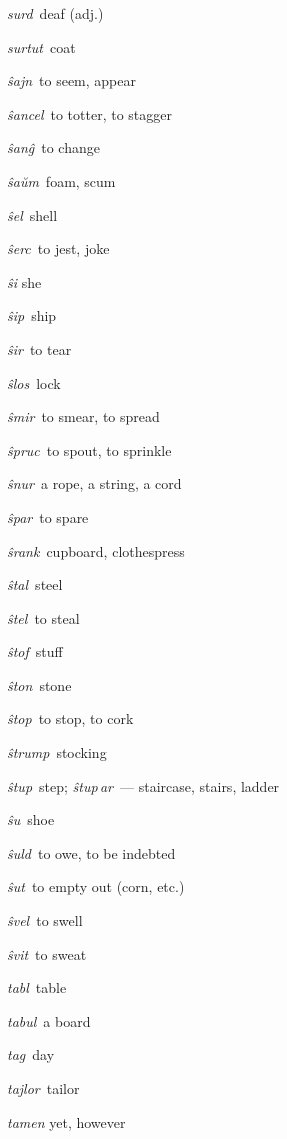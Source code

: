 \begin{landscape}
\begin{multicols}{5}
\begin{outdent}{1em}
\emph{surd\,} deaf (adj.)

\emph{surtut\,} coat
\end{outdent}


\begin{outdent}{1em}
\emph{ŝajn\,} to seem, appear

\emph{ŝancel\,} to totter, to stagger

\emph{ŝanĝ\,} to change

\emph{ŝaŭm\,} foam, scum

\emph{ŝel\,} shell

\emph{ŝerc\,} to jest, joke

\emph{ŝi} she

\emph{ŝip\,} ship

\emph{ŝir\,} to tear

\emph{ŝlos\,} lock

\emph{ŝmir\,} to smear, to spread

\emph{ŝpruc\,} to spout, to sprinkle

\emph{ŝnur\,} a rope, a string, a cord

\emph{ŝpar\,} to spare

\emph{ŝrank\,} cupboard, clothespress

\emph{ŝtal\,} steel

\emph{ŝtel\,} to steal

\emph{ŝtof\,} stuff

\emph{ŝton\,} stone

\emph{ŝtop\,} to stop, to cork

\emph{ŝtrump\,} stocking

\emph{ŝtup\,} step; \emph{ŝtup\,ar\,} — staircase, stairs, ladder

\emph{ŝu\,} shoe

\emph{ŝuld\,} to owe, to be indebted

\emph{ŝut\,} to empty out (corn, etc.)

\emph{ŝvel\,} to swell

\emph{ŝvit\,} to sweat
\end{outdent}


\begin{outdent}{1em}
\emph{tabl\,} table

\emph{tabul\,} a board

\emph{tag\,} day

\emph{tajlor\,} tailor

\emph{tamen} yet, however


\end{outdent}
\end{multicols}
\end{landscape}
